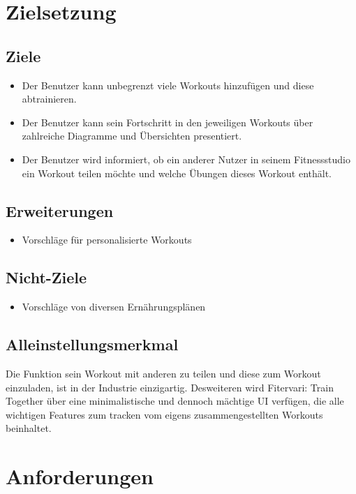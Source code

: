 \documentclass[12pt]{article}
\theoremstyle{definition}
\begin{document}
\pagebreak

\section{Zielsetzung}

\subsection{Ziele}
\begin{itemize}
\item Der Benutzer kann unbegrenzt viele Workouts hinzufügen und diese abtrainieren.
\item Der Benutzer kann sein Fortschritt in den jeweiligen Workouts über zahlreiche Diagramme und Übersichten presentiert.
\item Der Benutzer wird informiert, ob ein anderer Nutzer in seinem Fitnessstudio ein Workout teilen möchte und welche Übungen dieses Workout enthält.
\end{itemize}
\subsection{Erweiterungen}
\begin{itemize}
\item Vorschläge für personalisierte Workouts
\end{itemize}

\subsection{Nicht-Ziele}
\begin{itemize}
\item Vorschläge von diversen Ernährungsplänen

\end{itemize}

\subsection{Alleinstellungsmerkmal}
Die Funktion sein Workout mit anderen zu teilen und diese zum Workout einzuladen, ist in der Industrie einzigartig. Desweiteren wird Fitervari: Train Together über eine minimalistische und dennoch mächtige UI verfügen, die alle wichtigen Features zum tracken vom eigens zusammengestellten Workouts beinhaltet.

\pagebreak

\section{Anforderungen}
\end{document}
